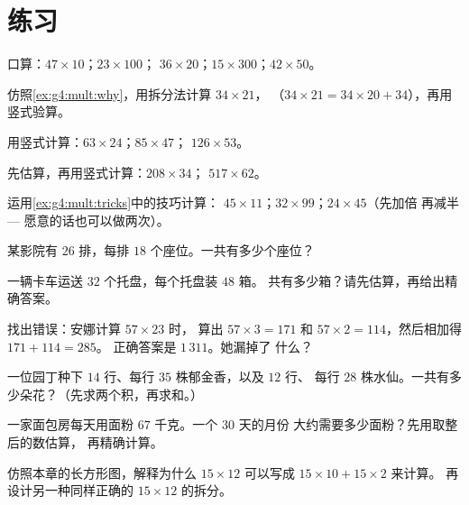 \section{练习}

\begin{exercise}[$\star$]\label{exo:g4:mult:1}
口算：$47 \times 10$；\quad $23 \times 100$；\quad
$36 \times 20$；\quad $15 \times 300$；\quad $42 \times 50$。
\end{exercise}

\begin{exercise}[$\star$]\label{exo:g4:mult:2}
仿照\cref{ex:g4:mult:why}，用拆分法计算 $34 \times 21$，
（$34 \times 21 = 34 \times 20 + 34$），再用竖式验算。
\end{exercise}

\begin{exercise}[$\star$]\label{exo:g4:mult:3}
用竖式计算：$63 \times 24$；\quad $85 \times 47$；\quad
$126 \times 53$。
\end{exercise}

\begin{exercise}[$\star$]\label{exo:g4:mult:4}
先估算，再用竖式计算：$208 \times 34$；\quad
$517 \times 62$。
\end{exercise}

\begin{exercise}[$\star$]\label{exo:g4:mult:5}
运用\cref{ex:g4:mult:tricks}中的技巧计算：
$45 \times 11$；\quad $32 \times 99$；\quad $24 \times 45$（先加倍
再减半 --- 愿意的话也可以做两次）。
\end{exercise}

\begin{exercise}[$\star$]\label{exo:g4:mult:6}
某影院有 $26$ 排，每排 $18$ 个座位。一共有多少个座位？
\end{exercise}

\begin{exercise}[$\star$]\label{exo:g4:mult:7}
一辆卡车运送 $32$ 个托盘，每个托盘装 $48$ 箱。
共有多少箱？请先估算，再给出精确答案。
\end{exercise}

\begin{exercise}[$\star$]\label{exo:g4:mult:8}
找出错误：安娜计算 $57 \times 23$ 时，
算出 $57 \times 3 = 171$ 和 $57 \times 2 = 114$，然后相加得 $171 + 114 = 285$。
正确答案是 $1\,311$。她漏掉了
什么？
\end{exercise}

\begin{exercise}[$\star\star$]\label{exo:g4:mult:9}
一位园丁种下 $14$ 行、每行 $35$ 株郁金香，以及 $12$ 行、
每行 $28$ 株水仙。一共有多少朵花？（先求两个积，再求和。）
\end{exercise}

\begin{exercise}[$\star\star$]\label{exo:g4:mult:10}
一家面包房每天用面粉 $67$ 千克。一个 $30$ 天的月份
大约需要多少面粉？先用取整后的数估算，
再精确计算。
\end{exercise}

\begin{exercise}[$\star\star$]\label{exo:g4:mult:11}
仿照本章的长方形图，解释为什么
$15 \times 12$ 可以写成 $15 \times 10 + 15 \times 2$ 来计算。
再设计另一种同样正确的 $15 \times 12$ 的拆分。
\end{exercise}
